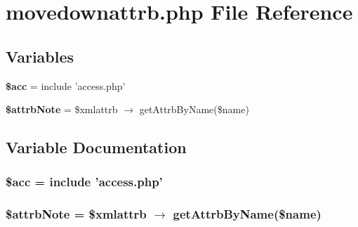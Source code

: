 \section{movedownattrb.php File Reference}
\label{movedownattrb_8php}


\subsection*{Variables}
\begin{CompactItemize}
\item 
{\bf \$acc} = include 'access.php'
\item 
{\bf \$attrb\-Note} = \$xmlattrb $\rightarrow$ get\-Attrb\-By\-Name(\$name)
\end{CompactItemize}


\subsection{Variable Documentation}
\subsubsection{\setlength{\rightskip}{0pt plus 5cm}\$acc = include 'access.php'}\label{movedownattrb_8php_542926c588a05eb69553d79c83cf73da}


\subsubsection{\setlength{\rightskip}{0pt plus 5cm}\$attrb\-Note = \$xmlattrb $\rightarrow$ get\-Attrb\-By\-Name(\$name)}\label{movedownattrb_8php_da7a2988da22b86a954a27a8d1f68a5f}


